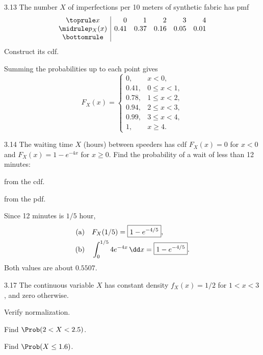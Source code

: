 \documentclass[11pt,oneside]{article}
\begin{document}
\begin{exercise}{3.13}
The number $X$ of imperfections per 10 meters of synthetic fabric has pmf
\[
\begin{array}{c|rrrrr}\toprule
x&0&1&2&3&4\\\midrule
p_X(x)&0.41&0.37&0.16&0.05&0.01\\\bottomrule
\end{array}
\]
Construct its cdf.
\end{exercise}

\begin{solution}
Summing the probabilities up to each point gives
\[
F_X(x)=\begin{cases}
0,&x<0,\\0.41,&0\le x<1,\\0.78,&1\le x<2,\\0.94,&2\le x<3,\\0.99,&3\le x<4,\\1,&x\ge4.
\end{cases}
\]
\end{solution}

\begin{exercise}{3.14}
The waiting time $X$ (hours) between speeders has cdf $F_X(x)=0$ for $x<0$ and $F_X(x)=1-e^{-4x}$ for $x\ge0$. Find the probability of a wait of less than 12 minutes:
\begin{exercisesubparts}
\item from the cdf.
\item from the pdf.
\end{exercisesubparts}
\end{exercise}

\begin{solution}
Since 12 minutes is $1/5$ hour,
\begin{align*}
\textup{(a)}\quad&F_X(1/5)=\boxed{1-e^{-4/5}},\\
\textup{(b)}\quad&\int_0^{1/5}4e^{-4x}\,\dd x=\boxed{1-e^{-4/5}}.
\end{align*}
Both values are about $0.5507$.
\end{solution}

\begin{exercise}{3.17}
The continuous variable $X$ has constant density $f_X(x)=1/2$ for $1<x<3$, and zero otherwise.
\begin{exercisesubparts}
\item Verify normalization.
\item Find $\Prob(2<X<2.5)$.
\item Find $\Prob(X\le1.6)$.
\end{exercisesubparts}
\end{exercise}
\end{document}
